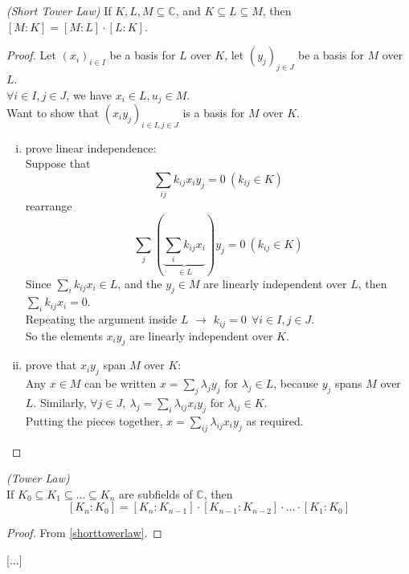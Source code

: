 \documentclass{article}
\theoremstyle{definition}
\newenvironment{thm}[1]
{\renewcommand\theinnerthm{#1}\innerthm}
{\endinnerthm}
\newenvironment{cor}[1]
{\renewcommand\theinnercor{#1}\innercor}
{\endinnercor}
\begin{document}
\begin{thm}{6.4}\emph{(Short Tower Law)} \label{shorttowerlaw}
  If $K, L, M \subseteq \mathbb{C}$, and $K \subseteq L \subseteq M$, then $[M:K]=[M:L]\cdot [L:K]$.
\end{thm}
\begin{proof}
  Let $(x_i)_{i \in I}$ be a basis for $L$ over $K$,
  let $(y_j)_{j \in J}$ be a basis for $M$ over $L$.\\
  $\forall i \in I, j \in J$, we have $x_i \in L, u_j \in M$.
  \\
  Want to show that $(x_i y_j)_{i\in I, j\in J}$ is a basis for $M$ over $K$.
  \begin{enumerate}[i.]
    \item prove linear independence:\\
      Suppose that
      $$\sum_{ij} k_{ij} x_i y_j = 0 ~(k_{ij} \in K)$$
      rearrange
      $$\sum_j (\underbrace{\sum_i k_{ij} x_i}_{\in L}) y_j = 0 ~(k_{ij} \in K)$$
      Since $\sum_i k_{ij} x_i \in L$, and the $y_j \in M$ are linearly independent over $L$, then $\sum_i k_{ij} x_i = 0$.
      \\
      Repeating the argument inside $L$ $\longrightarrow$ $k_{ij}=0 ~~\forall i\in I, j\in J$.
      \\
      So the elements $x_i y_j$ are linearly independent over $K$.

    \item prove that $x_i y_j$ span $M$ over $K$:\\
      Any $x \in M$ can be written $x=\sum_j \lambda_j y_j$ for $\lambda_j \in L$, because $y_j$ spans $M$ over $L$.
      Similarly, $\forall j\in J,~ \lambda_j = \sum_i \lambda_{ij} x_i y_j$ for  $\lambda_{ij} \in K$.\\
      Putting the pieces together, $x=\sum_{ij} \lambda_{ij} x_i y_j$ as required.
  \end{enumerate}
\end{proof}

\begin{cor}{6.6}\emph{(Tower Law)}\\ \label{towerlaw}
  If $K_0 \subseteq K_1 \subseteq \ldots \subseteq K_n$ are subfields of $\mathbb{C}$, then
  $$[K_n:K_0] = [K_n:K_{n-1}] \cdot [K_{n-1}:K_{n-2}] \cdot \ldots \cdot [K_1: K_0]$$
\end{cor}
\begin{proof}
  From \ref{shorttowerlaw}.
\end{proof}

[...]
\end{document}
